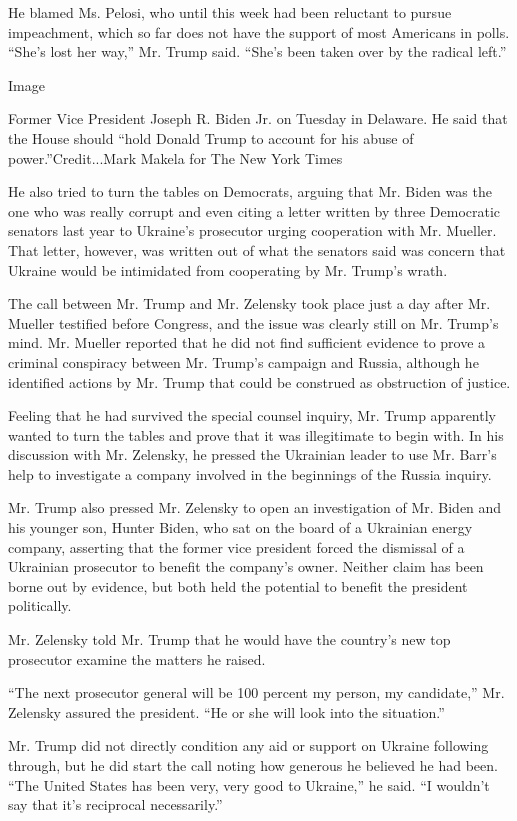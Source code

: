He blamed Ms. Pelosi, who until this week had been reluctant to pursue
impeachment, which so far does not have the support of most Americans in
polls. ``She's lost her way,'' Mr. Trump said. ``She's been taken over
by the radical left.''

Image

Former Vice President Joseph R. Biden Jr. on Tuesday in Delaware. He
said that the House should ``hold Donald Trump to account for his abuse
of power.''Credit...Mark Makela for The New York Times

He also tried to turn the tables on Democrats, arguing that Mr. Biden
was the one who was really corrupt and even citing a letter written by
three Democratic senators last year to Ukraine's prosecutor urging
cooperation with Mr. Mueller. That letter, however, was written out of
what the senators said was concern that Ukraine would be intimidated
from cooperating by Mr. Trump's wrath.

The call between Mr. Trump and Mr. Zelensky took place just a day after
Mr. Mueller testified before Congress, and the issue was clearly still
on Mr. Trump's mind. Mr. Mueller reported that he did not find
sufficient evidence to prove a criminal conspiracy between Mr. Trump's
campaign and Russia, although he identified actions by Mr. Trump that
could be construed as obstruction of justice.

Feeling that he had survived the special counsel inquiry, Mr. Trump
apparently wanted to turn the tables and prove that it was illegitimate
to begin with. In his discussion with Mr. Zelensky, he pressed the
Ukrainian leader to use Mr. Barr's help to investigate a company
involved in the beginnings of the Russia inquiry.

Mr. Trump also pressed Mr. Zelensky to open an investigation of Mr.
Biden and his younger son, Hunter Biden, who sat on the board of a
Ukrainian energy company, asserting that the former vice president
forced the dismissal of a Ukrainian prosecutor to benefit the company's
owner. Neither claim has been borne out by evidence, but both held the
potential to benefit the president politically.

Mr. Zelensky told Mr. Trump that he would have the country's new top
prosecutor examine the matters he raised.

``The next prosecutor general will be 100 percent my person, my
candidate,'' Mr. Zelensky assured the president. ``He or she will look
into the situation.''

Mr. Trump did not directly condition any aid or support on Ukraine
following through, but he did start the call noting how generous he
believed he had been. ``The United States has been very, very good to
Ukraine,'' he said. ``I wouldn't say that it's reciprocal necessarily.''


